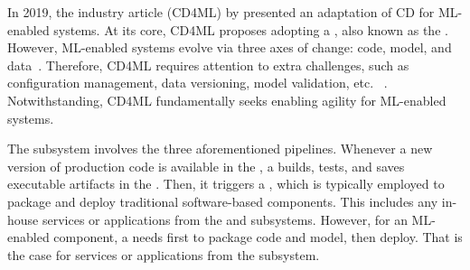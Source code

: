   In 2019, the industry article \emph{}
  (CD4ML) by \citeauthor{Sato2019ContinuousLearning} presented an adaptation
  of CD for ML-enabled systems. At its core, CD4ML proposes adopting a
  , also known as the
  \mbox{}.
  However, ML-enabled systems evolve via three axes of change:
  code, model, and data~\parencite{Sato2019ContinuousLearning}.
  Therefore, CD4ML requires attention to extra challenges, such as
  configuration management, data versioning, model validation, etc.%
  ~\parencite{Sato2019ContinuousLearning}. Notwithstanding, CD4ML
  fundamentally seeks enabling agility for ML-enabled systems.

  The  subsystem involves the three
  aforementioned pipelines. Whenever a new version of production code
  is available in the ,
  a \mbox{} builds, tests, and saves
  executable artifacts in the .
  Then, it triggers a , which is
  typically employed to package and deploy traditional software-based
  components. This includes any in-house services or applications from the
   and  subsystems.
  However, for an ML-enabled component, a 
  needs first to package code and model, then deploy. That is the case for
  services or applications from the  subsystem.

